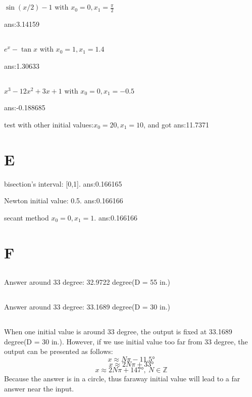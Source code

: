 \documentclass{article}
\begin{document}
    \subsection{}
    $\sin (x/2)-1$ with $x_0 = 0,x_1 = \frac{\pi}{2}$

    ans:3.14159
    \subsection{}
    $e^x-\tan x$ with $x_0 = 1,x_1 = 1.4$

    ans:1.30633
    \subsection{}
    $x^3-12x^2+3x+1$ with $x_0 = 0,x_1 = -0.5$

    ans:-0.188685

    test with other initial values:$x_0 = 20,x_1 = 10$, and got ans:11.7371
    \section{E}
    bisection's interval: [0,1]. ans:0.166165

    Newton initial value: 0.5. ans:0.166166

    secant method $x_0 = 0,x_1 = 1$. ans:0.166166
    \section{F}
    \subsection{}
    Answer around 33 degree: 32.9722 degree(D = 55 in.)
    \subsection{}
    Answer around 33 degree: 33.1689 degree(D = 30 in.)
    \subsection{}
    When one initial value is around 33 degree, the output is fixed at 33.1689 degree(D = 30 in.). However, if we use initial value too far from 33 degree, 
    the output can be presented as follows:
    $$x\approx N\pi -11.5°$$ 
    $$x \approx 2N\pi +33° $$
    $$x \approx 2N\pi +147°, \ N \in \mathbb{Z} $$
    Because the answer is in a circle, thus faraway initial value will lead to a far answer near the input.
\end{document}
